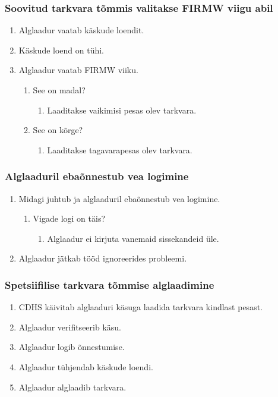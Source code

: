 \documentclass[12pt,a4paper]{article}
\begin{document}
\subsubsection{Soovitud tarkvara tõmmis valitakse FIRMW viigu abil}
\label{sec:usecase:fwselect}
\begin{enumerate}
	\item Alglaadur vaatab käskude loendit.
	\item Käskude loend on tühi.
	\item Alglaadur vaatab FIRMW viiku.
		\begin{enumerate}
			\item See on madal?
				\begin{enumerate}
					\item Laaditakse vaikimisi pesas olev tarkvara.
				\end{enumerate}
			\item See on kõrge?
				\begin{enumerate}
					\item Laaditakse tagavarapesas olev tarkvara.
				\end{enumerate}
		\end{enumerate}
\end{enumerate}

\subsubsection{Alglaaduril ebaõnnestub vea logimine}
\begin{enumerate}
	\item Midagi juhtub ja alglaaduril ebaõnnestub vea logimine.
		\begin{enumerate}
			\item Vigade logi on täis?
				\begin{enumerate}
					\item Alglaadur ei kirjuta vanemaid sissekandeid üle.
				\end{enumerate}
		\end{enumerate}
	\item Alglaadur jätkab tööd ignoreerides probleemi.
\end{enumerate}

\subsubsection{Spetsiifilise tarkvara tõmmise alglaadimine}
\begin{enumerate}
	\item CDHS käivitab alglaaduri käsuga laadida tarkvara kindlast pesast.
	\item Alglaadur verifitseerib käsu.
	\item Alglaadur logib õnnestumise.
	\item Alglaadur tühjendab käskude loendi.
	\item Alglaadur alglaadib tarkvara.
\end{enumerate}
\end{document}
